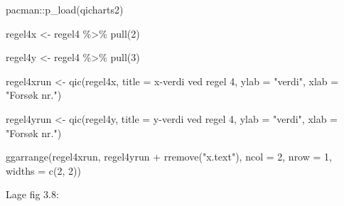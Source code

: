 \documentclass[
]{book}
\newenvironment{Shaded}{\begin{snugshade}}{\end{snugshade}}
\newcommand{\AttributeTok}[1]{\textcolor[rgb]{0.77,0.63,0.00}{#1}}
\newcommand{\DecValTok}[1]{\textcolor[rgb]{0.00,0.00,0.81}{#1}}
\newcommand{\FunctionTok}[1]{\textcolor[rgb]{0.00,0.00,0.00}{#1}}
\newcommand{\NormalTok}[1]{#1}
\newcommand{\OtherTok}[1]{\textcolor[rgb]{0.56,0.35,0.01}{#1}}
\newcommand{\SpecialCharTok}[1]{\textcolor[rgb]{0.00,0.00,0.00}{#1}}
\newcommand{\StringTok}[1]{\textcolor[rgb]{0.31,0.60,0.02}{#1}}
\begin{document}
\begin{Shaded}
\begin{Highlighting}[]
\NormalTok{pacman}\SpecialCharTok{::}\FunctionTok{p\_load}\NormalTok{(qicharts2)}

\NormalTok{regel4x }\OtherTok{\textless{}{-}}\NormalTok{ regel4 }\SpecialCharTok{\%\textgreater{}\%} \FunctionTok{pull}\NormalTok{(}\DecValTok{2}\NormalTok{)}

\NormalTok{regel4y }\OtherTok{\textless{}{-}}\NormalTok{ regel4 }\SpecialCharTok{\%\textgreater{}\%} \FunctionTok{pull}\NormalTok{(}\DecValTok{3}\NormalTok{)}

\NormalTok{regel4xrun }\OtherTok{\textless{}{-}} \FunctionTok{qic}\NormalTok{(regel4x, }\AttributeTok{title =} \StringTok{\textquotesingle{}x{-}verdi ved regel 4\textquotesingle{}}\NormalTok{, }\AttributeTok{ylab =} \StringTok{"verdi"}\NormalTok{, }\AttributeTok{xlab =} \StringTok{"Forsøk nr."}\NormalTok{)}

\NormalTok{regel4yrun }\OtherTok{\textless{}{-}} \FunctionTok{qic}\NormalTok{(regel4y, }\AttributeTok{title =} \StringTok{\textquotesingle{}y{-}verdi ved regel 4\textquotesingle{}}\NormalTok{, }\AttributeTok{ylab =} \StringTok{"verdi"}\NormalTok{, }\AttributeTok{xlab =} \StringTok{"Forsøk nr."}\NormalTok{)}

\FunctionTok{ggarrange}\NormalTok{(regel4xrun, regel4yrun }\SpecialCharTok{+} \FunctionTok{rremove}\NormalTok{(}\StringTok{"x.text"}\NormalTok{), }\AttributeTok{ncol =} \DecValTok{2}\NormalTok{, }\AttributeTok{nrow =} \DecValTok{1}\NormalTok{,  }\AttributeTok{widths =} \FunctionTok{c}\NormalTok{(}\DecValTok{2}\NormalTok{, }\DecValTok{2}\NormalTok{))}
\end{Highlighting}
\end{Shaded}

Lage fig 3.8:
\end{document}
